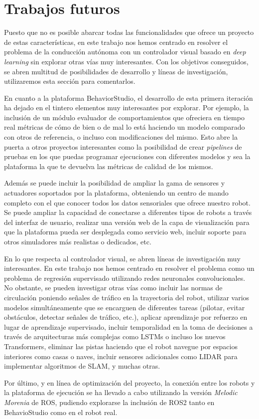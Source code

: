 \section{Trabajos futuros}

Puesto que no es posible abarcar todas las funcionalidades que ofrece un proyecto de estas características, en este trabajo nos hemos centrado en resolver el problema de la conducción autónoma con un controlador visual basado en \textit{deep learning} sin explorar otras vías muy interesantes. Con los objetivos conseguidos, se abren multitud de posibilidades de desarrollo y líneas de investigación, utilizaremos esta sección para comentarlos.

En cuanto a la plataforma BehaviorStudio, el desarrollo de esta primera iteración ha dejado en el tintero elementos muy interesantes por explorar. Por ejemplo, la inclusión de un módulo evaluador de comportamientos que ofreciera en tiempo real métricas de cómo de bien o de mal lo está haciendo un modelo comparado con otros de referencia, o incluso con modificaciones del mismo. Esto abre la puerta a otros proyectos interesantes como la posibilidad de crear \textit{pipelines} de pruebas en los que puedas programar ejecuciones con diferentes modelos y sea la plataforma la que te devuelva las métricas de calidad de los mismos.

Además se puede incluir la posibilidad de ampliar la gama de sensores y actuadores soportados por la plataforma, obteniendo un centro de mando completo con el que conocer todos los datos sensoriales que ofrece nuestro robot. Se puede ampliar la capacidad de conectarse a diferentes tipos de robots a través del interfaz de usuario, realizar una versión web de la capa de visualización para que la plataforma pueda ser desplegada como servicio web, incluir soporte para otros simuladores más realistas o dedicados, etc.

En lo que respecta al controlador visual, se abren líneas de investigación muy interesantes. En este trabajo nos hemos centrado en resolver el problema como un problema de regresión supervisado utilizando redes neuronales convolucionales. No obstante, se pueden investigar otras vías como incluir las normas de circulación poniendo señales de tráfico en la trayectoria del robot, utilizar varios modelos simultáneamente que se encarguen de diferentes tareas (pilotar, evitar obstáculos, detectar señales de tráfico, etc.), aplicar aprendizaje por refuerzo en lugar de aprendizaje supervisado, incluir temporalidad en la toma de decisiones a través de arquitecturas más complejas como LSTMs o incluso los nuevos Transformers, eliminar las pistas haciendo que el robot navegue por espacios interiores como casas o naves, incluir sensores adicionales como LIDAR para implementar algoritmos de SLAM, y muchas otras.

Por último, y en línea de optimización del proyecto, la conexión entre los robots y la plataforma de ejecución se ha llevado a cabo utilizando la versión \textit{Melodic Morenia} de ROS, pudiendo explorarse la inclusión de ROS2 tanto en BehavioStudio como en el robot real. 
